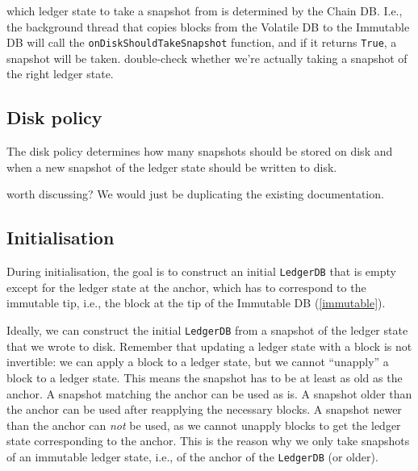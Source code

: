 which ledger state to take a snapshot from is determined by the
Chain DB. I.e., the background thread that copies blocks from the Volatile DB to
the Immutable DB will call the \lstinline!onDiskShouldTakeSnapshot! function,
and if it returns \lstinline!True!, a snapshot will be taken. 
double-check whether we're actually taking a snapshot of the right ledger state.

\subsection{Disk policy}
\label{ledgerdb:on-disk:disk-policy}

The disk policy determines how many snapshots should be stored on disk and when
a new snapshot of the ledger state should be written to disk.

 worth discussing? We would just be duplicating the existing
documentation.

\subsection{Initialisation}
\label{ledgerdb:on-disk:initialisation}

During initialisation, the goal is to construct an initial \lstinline!LedgerDB!
that is empty except for the ledger state at the anchor, which has to correspond
to the immutable tip, i.e., the block at the tip of the Immutable DB
(\cref{immutable}).

Ideally, we can construct the initial \lstinline!LedgerDB! from a snapshot of
the ledger state that we wrote to disk. Remember that updating a ledger state
with a block is not invertible: we can apply a block to a ledger state, but we
cannot ``unapply'' a block to a ledger state. This means the snapshot has to be
at least as old as the anchor. A snapshot matching the anchor can be used as is.
A snapshot older than the anchor can be used after reapplying the necessary
blocks. A snapshot newer than the anchor can \emph{not} be used, as we cannot
unapply blocks to get the ledger state corresponding to the anchor. This is the
reason why we only take snapshots of an immutable ledger state, i.e., of the
anchor of the \lstinline!LedgerDB! (or older).

